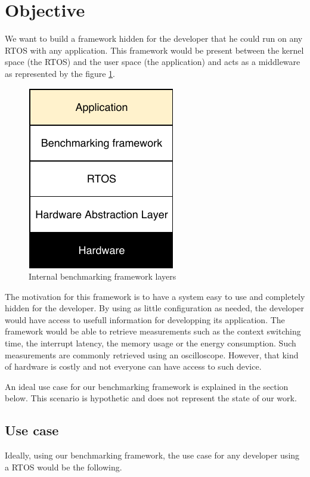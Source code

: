 \section{Objective}

We want to build a framework hidden for the developer that he could run on any RTOS with any application. This framework would be present between the kernel space (the RTOS) and the user space (the application) and acts as a middleware as represented by the figure \ref{fig:bench-framework-layers}.

\begin{figure}[!ht]
  \centering
  \includegraphics[scale=1]{assets/bench-framework-layers.pdf}
  \caption{\label{fig:bench-framework-layers}Internal benchmarking framework layers}
\end{figure}

The motivation for this framework is to have a system easy to use and completely hidden for the developer.
By using as little configuration as needed, the developer would have access to usefull information for developping its application.
The framework would be able to retrieve measurements such as the context switching time, the interrupt latency, the memory usage or the energy consumption.
Such measurements are commonly retrieved using an oscilloscope.
However, that kind of hardware is costly and not everyone can have access to such device.

An ideal use case for our benchmarking framework is explained in the section below.
This scenario is hypothetic and does not represent the state of our work.

\subsection{Use case}
Ideally, using our benchmarking framework, the use case for any developer using a RTOS would be the following.

